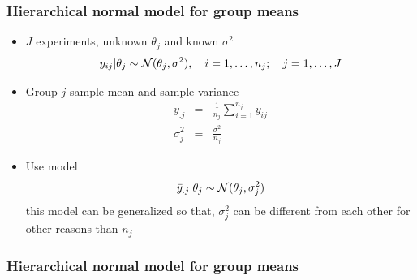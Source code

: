 \documentclass[10pt]{beamer}
\begin{document}
\begin{frame}

\frametitle{Hierarchical normal model for group means}

  \begin{itemize}
  \item $J$ experiments, unknown $\theta_j$ and known $\sigma^2$
    \begin{equation*}
      y_{ij}|\theta_j \sim \N(\theta_j,\sigma^2), \quad
      i=1,\ldots,n_j; \quad j=1,\ldots,J
    \end{equation*}
    \vspace{-6mm}
  \item Group $j$ sample mean and sample variance
    \begin{eqnarray*}
      \bar{y}_{.j} & = & \frac{1}{n_j}\sum_{i=1}^{n_j}y_{ij}\\
      \sigma_j^2 & = & \frac{\sigma^2}{n_j}
    \end{eqnarray*}
    \vspace{-6mm}
    \pause
  \item Use model
    \begin{eqnarray*}
      \bar{y}_{.j}|\theta_j \sim \N(\theta_j,\sigma_j^2)
    \end{eqnarray*}
     this model can be generalized so that, $\sigma_j^2$ can be
    different from each other for other reasons than $n_j$
  \end{itemize}
\end{frame}

\begin{frame}

\frametitle{Hierarchical normal model for group means}

    \begin{minipage}[b]{4cm}
      \begin{xy}
\end{xy}
\end{minipage}
\end{frame}
\end{document}
